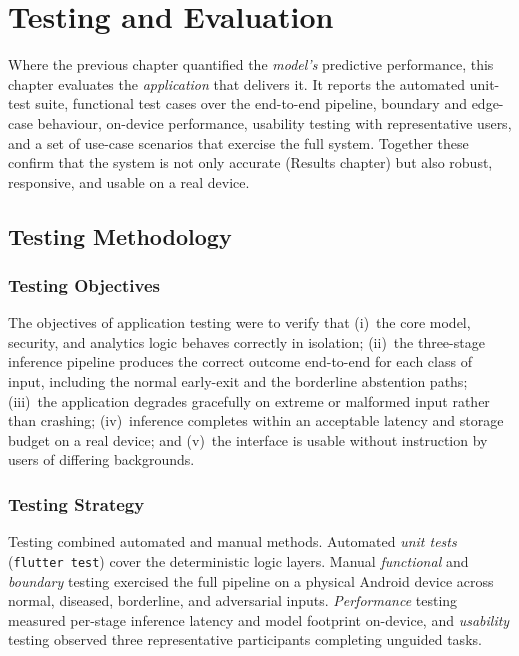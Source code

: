 \chapter{Testing and Evaluation}

Where the previous chapter quantified the \emph{model's} predictive performance,
this chapter evaluates the \emph{application} that delivers it. It reports the
automated unit-test suite, functional test cases over the end-to-end pipeline,
boundary and edge-case behaviour, on-device performance, usability testing with
representative users, and a set of use-case scenarios that exercise the full
system. Together these confirm that the system is not only accurate (Results
chapter) but also robust, responsive, and usable on a real device.

\section{Testing Methodology}

\subsection{Testing Objectives}

The objectives of application testing were to verify that (i)~the core
model, security, and analytics logic behaves correctly in isolation; (ii)~the
three-stage inference pipeline produces the correct outcome end-to-end for each
class of input, including the normal early-exit and the borderline abstention
paths; (iii)~the application degrades gracefully on extreme or malformed input
rather than crashing; (iv)~inference completes within an acceptable latency and
storage budget on a real device; and (v)~the interface is usable without
instruction by users of differing backgrounds.

\subsection{Testing Strategy}

Testing combined automated and manual methods. Automated \emph{unit tests}
(\texttt{flutter test}) cover the deterministic logic layers. Manual
\emph{functional} and \emph{boundary} testing exercised the full pipeline on a
physical Android device across normal, diseased, borderline, and adversarial
inputs. \emph{Performance} testing measured per-stage inference latency and
model footprint on-device, and \emph{usability} testing observed three
representative participants completing unguided tasks.

